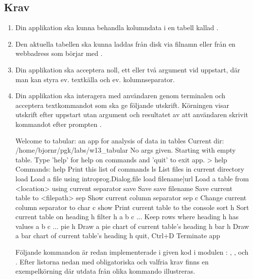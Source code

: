 \subsection{Krav}\label{tabular:requirements}

\begin{enumerate}[leftmargin=*]
\item Din applikation ska kunna behandla kolumndata i en tabell kallad .

\item Den aktuella tabellen ska kunna laddas från disk via filnamn eller från en webbadress som börjar med .

\item Din applikation ska acceptera noll, ett eller två argument vid uppstart, där man kan styra ev. textkälla och ev. kolumnseparator.

\item Din applikation ska interagera med användaren genom terminalen och acceptera textkommandot  som ska ge följande utskrift. Körningen visar utskrift efter uppstart utan argument och resultatet av att användaren skrivit kommandot  efter prompten .

\begin{REPLnonum}
Welcome to tabular: an app for analysis of data in tables
Current dir: /home/bjornr/pgk/labs/w13_tabular
No args given. Starting with empty table.
Type 'help' for help on commands and 'quit' to exit app.
> help
Commands:
help                 Print this list of commands
ls                   List files in current directory
load                 Load a file using introprog.Dialog.file
load filename|url    Load a table from <location> using current separator
save                 Save
save filename        Save current table to <filepath>
sep                  Show current column separator
sep c                Change current column separator to char c
show                 Print current table to the console
sort h               Sort current table on heading h
filter h a b c ...   Keep rows where heading h has values a b c ...
pie h                Draw a pie chart of current table's heading h
bar h                Draw a bar chart of current table's heading h
quit, Ctrl+D         Terminate app
\end{REPLnonum}
Följande kommandon är redan implementerade i given kod i modulen : , ,  och . Efter listorna nedan med obligatoriska och valfria krav finns en exempelkörning där utdata från olika kommando illustreras.


\end{enumerate}
